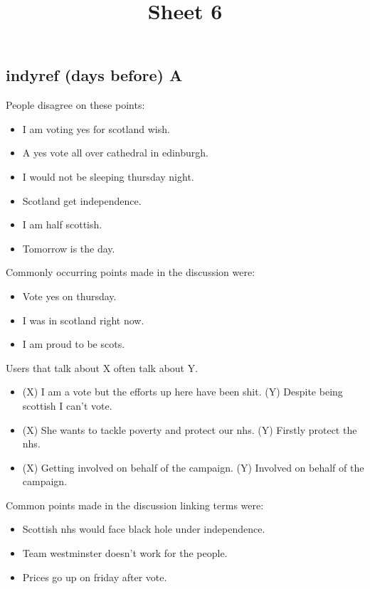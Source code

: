 \documentclass[tikz]{article}
\title{\textbf{Sheet 6}\vspace{-9ex}}
\date{}
\begin{document}
  \maketitle

  \begin{multicols}{2}
    \subsection*{indyref (days before) A}
    People disagree on these points:
    \begin{itemize}[noitemsep,nolistsep,label={}]
		\item{I am voting yes for scotland wish.}
		\item{A yes vote all over cathedral in edinburgh.}
		\item{I would not be sleeping thursday night.}
		\item{Scotland get independence.}
		\item{I am half scottish.}
		\item{Tomorrow is the day.}
    \end{itemize}

    Commonly occurring points made in the discussion were:
    \begin{itemize}[noitemsep,nolistsep,label={}]
		\item{Vote yes on thursday.}
		\item{I was in scotland right now.}
		\item{I am proud to be scots.}
    \end{itemize}

    Users that talk about X often talk about Y.
    \begin{itemize}[noitemsep,nolistsep,label={}]
		\item{(X) I am a vote but the efforts up here have been shit. (Y) Despite being scottish I can't vote.}
		\item{(X) She wants to tackle poverty and protect our nhs. (Y) Firstly protect the nhs.}
		\item{(X) Getting involved on behalf of the campaign. (Y) Involved on behalf of the campaign.}
    \end{itemize}

    Common points made in the discussion linking terms were:
    \begin{itemize}[noitemsep,nolistsep,label={}]
		\item{Scottish nhs would face black hole under independence.}
		\item{Team westminster doesn't work for the people.}
		\item{Prices go up on friday after vote.}
    \end{itemize}


\end{multicols}
\end{document}
